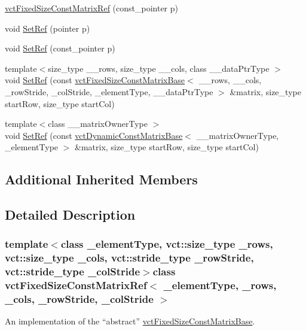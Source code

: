 \begin{DoxyCompactItemize}
\hyperlink{classvct_fixed_size_const_matrix_ref_a1b7ffdc29bd51d4146d80af23d2c22cc}{vct\-Fixed\-Size\-Const\-Matrix\-Ref} (const\-\_\-pointer p)
\item 
void \hyperlink{classvct_fixed_size_const_matrix_ref_adb19b8fe373b1a69924d09c169c3a36c}{Set\-Ref} (pointer p)
\item 
void \hyperlink{classvct_fixed_size_const_matrix_ref_a4710f4f6b69a83049cf519ad317def6d}{Set\-Ref} (const\-\_\-pointer p)
\item 
{\footnotesize template$<$size\-\_\-type \-\_\-\-\_\-rows, size\-\_\-type \-\_\-\-\_\-cols, class \-\_\-\-\_\-data\-Ptr\-Type $>$ }\\void \hyperlink{classvct_fixed_size_const_matrix_ref_a82664174d50cc4b0659c314f8b307be7}{Set\-Ref} (const \hyperlink{classvct_fixed_size_const_matrix_base}{vct\-Fixed\-Size\-Const\-Matrix\-Base}$<$ \-\_\-\-\_\-rows, \-\_\-\-\_\-cols, \-\_\-row\-Stride, \-\_\-col\-Stride, \-\_\-element\-Type, \-\_\-\-\_\-data\-Ptr\-Type $>$ \&matrix, size\-\_\-type start\-Row, size\-\_\-type start\-Col)
\item 
{\footnotesize template$<$class \-\_\-\-\_\-matrix\-Owner\-Type $>$ }\\void \hyperlink{classvct_fixed_size_const_matrix_ref_a3f94703b589c4c419a49e46b77b19943}{Set\-Ref} (const \hyperlink{classvct_dynamic_const_matrix_base}{vct\-Dynamic\-Const\-Matrix\-Base}$<$ \-\_\-\-\_\-matrix\-Owner\-Type, \-\_\-element\-Type $>$ \&matrix, size\-\_\-type start\-Row, size\-\_\-type start\-Col)
\end{DoxyCompactItemize}
\subsection*{Additional Inherited Members}


\subsection{Detailed Description}
\subsubsection*{template$<$class \-\_\-element\-Type, vct\-::size\-\_\-type \-\_\-rows, vct\-::size\-\_\-type \-\_\-cols, vct\-::stride\-\_\-type \-\_\-row\-Stride, vct\-::stride\-\_\-type \-\_\-col\-Stride$>$class vct\-Fixed\-Size\-Const\-Matrix\-Ref$<$ \-\_\-element\-Type, \-\_\-rows, \-\_\-cols, \-\_\-row\-Stride, \-\_\-col\-Stride $>$}

An implementation of the ``abstract'' \hyperlink{classvct_fixed_size_const_matrix_base}{vct\-Fixed\-Size\-Const\-Matrix\-Base}. 

